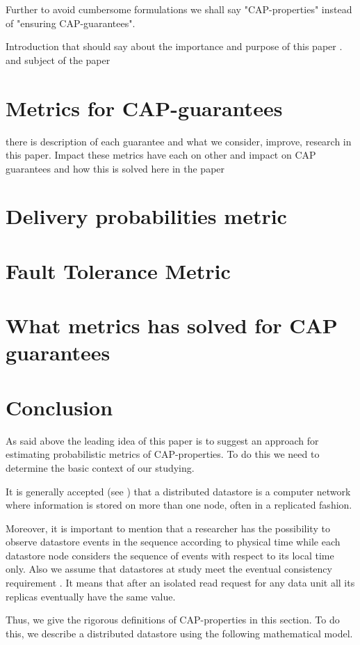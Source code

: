 \documentclass{llncs}
\begin{document}
Further to avoid cumbersome formulations we shall say "CAP-properties" 
instead of "ensuring CAP-guarantees".

Introduction that should say about the importance and purpose of this paper . and subject of the paper

\section{Metrics for CAP-guarantees}\label{sec:metrics_general}
there is description of each guarantee and what we consider, improve, research in this paper.
Impact these metrics have each on other and impact on CAP guarantees and how this is solved here
in the paper

\section{Delivery probabilities metric}
\section{Fault Tolerance Metric}
\section{What metrics has solved for CAP guarantees}
\section{Conclusion}
As said above the leading idea of this paper is to suggest an approach for estimating probabilistic
metrics of CAP-properties.
To do this we need to determine the basic context of our studying.

It is generally accepted (see \cite{bib:datastore-def}) that a distributed datastore is a computer
network where information is stored on more than one node, often in a replicated fashion.

Moreover, it is important to mention that a researcher has the possibility to observe datastore events in the sequence according to physical time while each datastore node considers the sequence of events with respect to its local time only.
Also we assume that datastores at study meet the eventual consistency requirement
\cite{bib:tanenbaum}.
It means that after an isolated read request for any data unit all its replicas eventually have
the same value.

Thus, we give the rigorous definitions of CAP-properties in this section.
To do this, we describe a distributed datastore using the following mathematical model. 
\end{document}
